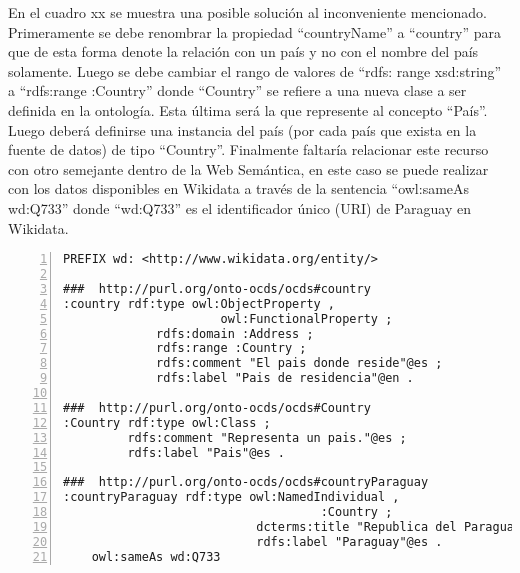  En el cuadro xx se muestra una posible solución al inconveniente mencionado. Primeramente se debe renombrar la propiedad “countryName” a “country” para que de esta forma denote la relación con un país y no con el nombre del país solamente. Luego se debe cambiar el rango de valores de “rdfs: range xsd:string” a “rdfs:range :Country” donde “Country” se refiere a una nueva clase a ser definida en la ontología. Esta última será la que represente al concepto “País”. Luego deberá definirse una instancia del país (por cada país que exista en la fuente de datos) de tipo “Country”. Finalmente faltaría relacionar este recurso con otro semejante dentro de la Web Semántica, en este caso se puede realizar con los datos disponibles en Wikidata a través de la sentencia “owl:sameAs wd:Q733” donde “wd:Q733” es el identificador único (URI) de Paraguay en Wikidata.

 \begin{lstlisting}[captionpos=b, caption=Información referente al proceso licitatorio cuyo identificacor es, label=lst:caso3-3,  numbers=left,  numberstyle=\tiny\color{mygray},
    basicstyle=\small,frame=single]
PREFIX wd: <http://www.wikidata.org/entity/>

###  http://purl.org/onto-ocds/ocds#country
:country rdf:type owl:ObjectProperty ,
                      owl:FunctionalProperty ;
             rdfs:domain :Address ;
             rdfs:range :Country ;
             rdfs:comment "El pais donde reside"@es ;
             rdfs:label "Pais de residencia"@en .

###  http://purl.org/onto-ocds/ocds#Country
:Country rdf:type owl:Class ;
         rdfs:comment "Representa un pais."@es ;
         rdfs:label "Pais"@es .

###  http://purl.org/onto-ocds/ocds#countryParaguay
:countryParaguay rdf:type owl:NamedIndividual ,
                                    :Country ;
                           dcterms:title "Republica del Paraguay"@es ;
                           rdfs:label "Paraguay"@es .
    owl:sameAs wd:Q733
 \end{lstlisting}

